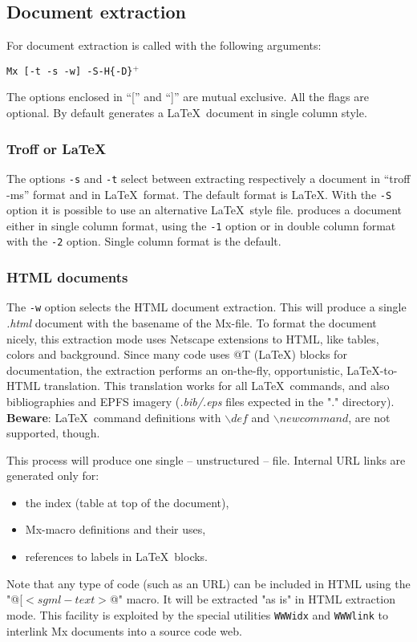 \documentclass{article}
\begin{document}
\subsection{Document extraction}

For document extraction \Mx is called with the following arguments:

\noindent
\begin{center}
	{\tt Mx [-t -s -w] -S\file [-1 -2] -H\n  \{-D\macro\}$^+$\mxfile}
\end{center}

The options enclosed in ``['' and ``]'' are mutual exclusive. 
All the flags are optional. By default \Mx generates a \LaTeX\
document in single column style.

\subsubsection{Troff or \LaTeX}
The options {\tt -s} and {\tt -t} select between extracting 
respectively a document in ``troff -ms'' format and in \LaTeX\ format.
The default format is \LaTeX. With the {\tt -S\file} option
it is possible to use an alternative \LaTeX\ style file. 
\Mx produces a document either in single column format, using the
{\tt -1} option or in double column format with the {\tt -2} option.
Single column format is the default.

\subsubsection{HTML documents}
The {\tt -w} option selects the HTML document extraction. This will
produce a single {\em .html} document with the basename of the Mx-file. To
format the document nicely, this extraction mode uses Netscape extensions
to HTML, like tables, colors and background.  Since many code uses @T 
(\LaTeX) blocks for documentation, the extraction performs an on-the-fly,
opportunistic, \LaTeX-to-HTML translation. This translation
works for all \LaTeX\ commands, and also bibliographies and EPFS imagery
({\em .bib/.eps} files expected in the "." directory). {\bf Beware}:
\LaTeX\ command definitions with $\backslash def$ and
$\backslash newcommand$, are not supported, though.

This process will produce one single -- unstructured -- file. Internal
URL links are generated only for: 
\begin{itemize}
\item the index (table at top of the document),
\item Mx-macro definitions and their uses, 
\item references to labels in \LaTeX\ blocks.
\end{itemize}
Note that any type of code (such as an URL) can be included in HTML
using the "@[$<sgml-text>$@" macro. It will be extracted "as is" in HTML
extraction mode. This facility is exploited by the special utilities 
{\tt WWWidx} and {\tt WWWlink} to interlink Mx documents into a source code
web.
\end{document}
